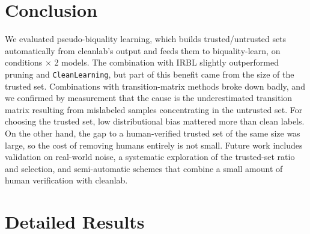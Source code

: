 \documentclass[a4paper,10pt]{article}
\newcommand{\method}[1]{\texttt{#1}}
\newcommand{\cl}{\textsf{cleanlab}}
\newcommand{\bq}{\textsf{biquality-learn}}
\begin{document}
\section{Conclusion}
We evaluated pseudo-biquality learning, which builds trusted/untrusted sets automatically from \cl{}'s output and feeds them to \bq{}, on \NCond{} conditions $\times$ 2 models.
The combination with IRBL slightly outperformed pruning and \texttt{CleanLearning}, but part of this benefit came from the size of the trusted set.
Combinations with transition-matrix methods broke down badly, and we confirmed by measurement that the cause is the underestimated transition matrix resulting from mislabeled samples concentrating in the untrusted set.
For choosing the trusted set, low distributional bias mattered more than clean labels.
On the other hand, the gap to a human-verified trusted set of the same size was large, so the cost of removing humans entirely is not small.
Future work includes validation on real-world noise, a systematic exploration of the trusted-set ratio and selection, and semi-automatic schemes that combine a small amount of human verification with \cl{}.

\printbibliography

\appendix
\clearpage
\section{Detailed Results}

\begin{table}[htbp]
  \centering
  \caption{$\Delta$ by noise kind and rate (pt, all methods). The first row is the accuracy of \method{baseline} (\%).}
  \label{tab:noise-all}
  \scriptsize
  \setlength{\tabcolsep}{4pt}
  
\end{table}

\begin{table}[htbp]
  \centering
  \caption{$\Delta$ by dataset (pt, all methods, mean over 3 noise kinds $\times$ 2 rates $\times$ 5 seeds). The first row is the accuracy of \method{baseline} (\%).}
  \label{tab:dataset-all}
  \scriptsize
  
\end{table}

\begin{table}[htbp]
  \centering
  \caption{Check of the HGB learning rate: accuracy (\%) of 5-fold cross-validation within the training split of each seed (true labels, no test data). Mean (min--max) over 5 seeds.}
  \label{tab:hgb-lr}
  \footnotesize
  
\end{table}
\end{document}
